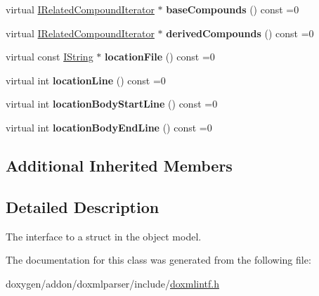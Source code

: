 \begin{DoxyCompactItemize}
virtual \mbox{\hyperlink{class_i_related_compound_iterator}{I\+Related\+Compound\+Iterator}} $\ast$ {\bfseries base\+Compounds} () const =0
\item 
\mbox{\label{class_i_struct_ade71cbf4e35aea5be4ea2c5528782ab3}} 
virtual \mbox{\hyperlink{class_i_related_compound_iterator}{I\+Related\+Compound\+Iterator}} $\ast$ {\bfseries derived\+Compounds} () const =0
\item 
\mbox{\label{class_i_struct_a6427208325a1a9a648e43aa254ec483b}} 
virtual const \mbox{\hyperlink{class_i_string}{I\+String}} $\ast$ {\bfseries location\+File} () const =0
\item 
\mbox{\label{class_i_struct_afd43fdec6f15bc6d2009783b065c7b6e}} 
virtual int {\bfseries location\+Line} () const =0
\item 
\mbox{\label{class_i_struct_aacecbb0d8efd04c45dc9c3c999e1d0f8}} 
virtual int {\bfseries location\+Body\+Start\+Line} () const =0
\item 
\mbox{\label{class_i_struct_a809fa0d9316b8264c5052ad85450b371}} 
virtual int {\bfseries location\+Body\+End\+Line} () const =0
\end{DoxyCompactItemize}
\subsection*{Additional Inherited Members}


\subsection{Detailed Description}
The interface to a struct in the object model. 

The documentation for this class was generated from the following file\+:\begin{DoxyCompactItemize}
\item 
doxygen/addon/doxmlparser/include/\mbox{\hyperlink{include_2doxmlintf_8h}{doxmlintf.\+h}}\end{DoxyCompactItemize}
